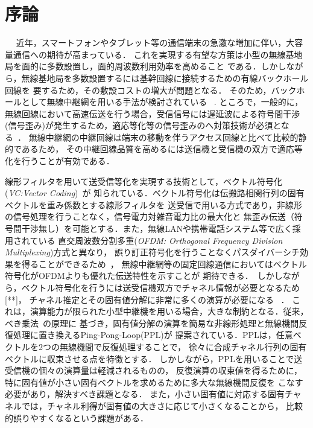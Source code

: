 \chapter{序論}
　
近年，スマートフォンやタブレット等の通信端末の急激な増加に伴い，大容量通信への期待が高まっている．
これを実現する有望な方策は小型の無線基地局を面的に多数設置し，面的周波数利用効率を高めること
である．しかしながら，無線基地局を多数設置するには基幹回線に接続するための有線バックホール回線を
要するため，その敷設コストの増大が問題となる．
そのため，バックホールとして無線中継網を用いる手法が検討されている~\cite{yamo} \cite{pabst}.
 ところで，一般的に，無線回線において高速伝送を行う場合，受信信号には遅延波による符号間干渉
 (信号歪み)が発生するため，適応等化等の信号歪みのへ対策技術が必須となる~\cite{akaiwa}．
 無線中継網の中継回線は端末の移動を伴うアクセス回線と比べて比較的静的であるため，
 その中継回線品質を高めるには送信機と受信機の双方で適応等化を行うことが有効である．

 線形フィルタを用いて送受信等化を実現する技術として，ベクトル符号化(\emph{VC:Vector Coding})~\cite{kasturia}が
知られている．ベクトル符号化は伝搬路相関行列の固有ベクトルを重み係数とする線形フィルタを
送受信で用いる方式であり，非線形の信号処理を行うことなく，信号電力対雑音電力比の最大化と
無歪み伝送（符号間干渉無し）を可能とする．また，無線LANや携帯電話システム等で広く採用されている
直交周波数分割多重(\emph{OFDM: Orthogonal Frequency Division Multiplexing})方式と異なり，
誤り訂正符号化を行うことなくパスダイバーシチ効果を得ることができるため~\cite{furukawa}，
無線中継網等の固定回線通信においてはベクトル符号化がOFDMよりも優れた伝送特性を示すことが
期待できる．~\cite{furukawa,li,takeda,takanashi}しかしながら，ベクトル符号化を行うには送受信機双方でチャネル情報が必要となるため[**]，
チャネル推定とその固有値分解に非常に多くの演算が必要になる~\cite{takano} \cite{takeda2}．
これは，演算能力が限られた小型中継機を用いる場合，大きな制約となる．従来，べき乗法~\cite{strang}の原理に
基づき，固有値分解の演算を簡易な非線形処理と無線機間反復処理に置き換えるPing-Pong-Loop(PPL)が
提案されている．PPLは，任意ベクトルを2つの無線機間で反復処理することで，
徐々に合成チャネル行列の固有ベクトルに収束させる点を特徴とする．
しかしながら，PPLを用いることで送受信機の個々の演算量は軽減されるものの，
反復演算の収束値を得るために，特に固有値が小さい固有ベクトルを求めるために多大な無線機間反復を
こなす必要があり，解決すべき課題となる．
また，小さい固有値に対応する固有チャネルでは，チャネル利得が固有値の大きさに応じて小さくなることから，
比較的誤りやすくなるという課題がある．

